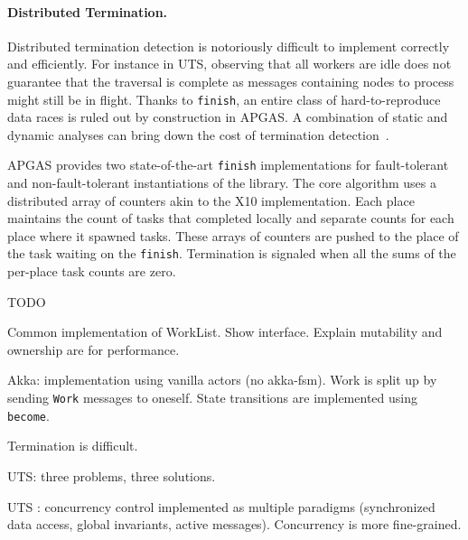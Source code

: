 \paragraph{Distributed Termination.} Distributed termination detection is notoriously difficult to implement correctly and efficiently.
For instance in UTS, observing that all workers are idle does not guarantee that the traversal is complete as messages containing nodes to process might still be in flight. Thanks to \lstinline{finish}, an entire class of hard-to-reproduce data races is ruled out by construction in APGAS.
A combination of static and dynamic analyses can bring down the cost of termination detection~\cite{TardieuETAL14X10ApgasAtPetascale}. 

APGAS provides two state-of-the-art \lstinline{finish} implementations for fault-tolerant and non-fault-tolerant instantiations of the library. The core algorithm uses a distributed array of counters akin to the X10 implementation. Each place maintains the count of tasks that completed locally and separate counts for each place where it spawned tasks. These arrays of counters are pushed to the place of the task waiting on the \lstinline{finish}. Termination is signaled when all the sums of the per-place task counts are zero.


TODO

Common implementation of WorkList. Show interface. Explain mutability and
ownership are for performance.

Akka: implementation using vanilla actors (no akka-fsm). Work is split up by
sending \lstinline{Work} messages to oneself. State transitions are implemented
using \lstinline{become}.

Termination is difficult.

UTS: three problems, three solutions.

UTS \apgas: concurrency control implemented as multiple paradigms (synchronized
data access, global invariants, active messages). Concurrency is more
fine-grained.





